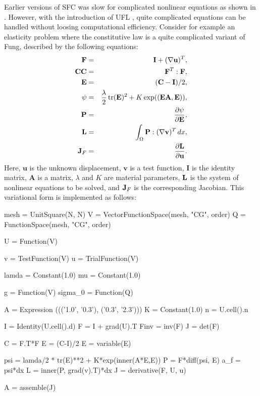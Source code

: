 Earlier versions of SFC was slow for complicated nonlinear equations as shown in \cite{AlnaesMardal2009b}.
However, with the introduction of UFL \cite{AlnaesThesis, AlnaesA.Logg2009}, quite complicated 
equations can be handled without loosing computational efficiency. Consider for example an elasticity problem 
where the constitutive law is a quite complicated variant of Fung, described by 
the following equations: 
\begin{eqnarray}
\mathbf{F} &=& \mathbf{I} + (\nabla \mathbf{u})^T, \\  
\mathbf{CC} &=& \mathbf{F}^T: \mathbf{F}, \\
\mathbf{E} &=& (\mathbf{C}-\mathbf{I})/2, \\ 
\psi &=& \frac{\lambda}{2} \, \mbox{tr}(\mathbf{E})^2 + K\exp((\mathbf{E}\mathbf{A},\mathbf{E})), \\  
\mathbf{P} &=& \frac{\partial \psi}{\partial \mathbf{E}}, \\
\mathbf{L} &=& \int_\Omega \mathbf{P}: (\nabla \mathbf{v})^T \, dx, \\  
\mathbf{J}_F &=& \frac{\partial \mathbf{L}}{\partial \mathbf{u}} . 
\end{eqnarray}
Here, $\mathbf{u}$ is the unknown displacement, $\mathbf{v}$ is a test function, $\mathbf{I}$ is the identity matrix, $\mathbf{A}$ 
is a matrix, $\lambda$ and $K$  are  material parameters, $\mathbf{L}$ is the system of nonlinear equations to be solved, and 
$\mathbf{J}_F$ is the corresponding Jacobian. 
This variational form is implemented as follows: 
\begin{python}
  mesh = UnitSquare(N, N)
  V = VectorFunctionSpace(mesh, "CG", order)
  Q = FunctionSpace(mesh, "CG", order)
  
  U = Function(V)
  
  v = TestFunction(V)
  u = TrialFunction(V)
  
  lamda = Constant(1.0)
  mu = Constant(1.0)
  
  g       = Function(V)
  sigma_0 = Function(Q)
  
  A = Expression ((('1.0', '0.3'), ('0.3', '2.3')))
  K = Constant(1.0)
  n = U.cell().n
  
  I = Identity(U.cell().d)
  F = I + grad(U).T
  Finv = inv(F)
  J = det(F)
  
  C = F.T*F
  E = (C-I)/2
  E = variable(E)
  
  psi = lamda/2 * tr(E)**2  +  K*exp(inner(A*E,E))
  P = F*diff(psi, E)
  a_f = psi*dx
  L = inner(P, grad(v).T)*dx 
  J = derivative(F, U, u)
  
  A = assemble(J)
\end{python}

